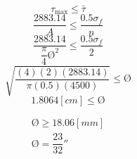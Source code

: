 \documentclass[letter,10pt,twoside]{article}
\begin{document}
\begin{equation*}
    \tau_{\text{max}} \le \bar{\tau}
\end{equation*}
\begin{equation*}
    \frac{2883.14}{A} \le \frac{0.5 \sigma_f}{n}
\end{equation*}
\begin{equation*}
    \frac{2883.14}{\dfrac{\pi}{4} \text{\O}^2} \le \frac{0.5 \sigma_f}{2}
\end{equation*}
\begin{equation*}
    \sqrt{\frac{(4)(2)(2883.14)}{\pi(0.5)(4500)}} \le \text{\O}
\end{equation*}
\begin{equation*}
    1.8064[cm] \le \text{\O}
\end{equation*}

\begin{equation*}
\boxed{
    \boxed{
        \begin{array}{l}
            \text{\O} \ge 18.06[mm] \\
            \text{\O} = \dfrac{23}{32}''
        \end{array}
    }
}
\end{equation*}
\end{document}
